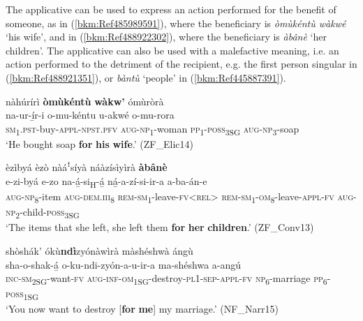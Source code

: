 The applicative can be used to express an action performed for the benefit of someone, as in (\ref{bkm:Ref485989591}), where the beneficiary is \textit{òmùkéntù wàkwé} ‘his wife’, and in (\ref{bkm:Ref488922302}), where the beneficiary is \textit{àbânè} ‘her children’. The applicative can also be used with a malefactive meaning, i.e. an action performed to the detriment of the recipient, e.g. the first person singular in (\ref{bkm:Ref488921351}), or \textit{bàntù} ‘people’ in (\ref{bkm:Ref445887391}).

\ea
\label{bkm:Ref485989591}
nàhúrírì \textbf{òmùkéntù} \textbf{wàkw’} ómùròrà\\
\gll na-ur-í̲r-i        o-mu-kéntu    u-akwé o-mu-rora\\
\textsc{sm}\textsubscript{1}.\textsc{pst}-buy-\textsc{appl}-\textsc{npst}.\textsc{pfv}  \textsc{aug}-\textsc{np}\textsubscript{1}-woman  \textsc{pp}\textsubscript{1}-\textsc{poss}\textsubscript{3SG}
\textsc{aug}-\textsc{np}\textsubscript{3}-soap\\
\glt ‘He bought soap \textbf{for} \textbf{his} \textbf{wife}.’ (ZF\_Elic14)
\z

\ea
\label{bkm:Ref488922302}
èzìbyá èzò nàáꜝsíyà náàzísìyìrà \textbf{àbânè}\\
\gll e-zi-byá    e-zo    na-á̲-si\textsubscript{H}-á̲
ná̲-a-zí-si-ir-a       a-ba-án-e\\
\textsc{aug}-\textsc{np}\textsubscript{8}-item  \textsc{aug}-\textsc{dem}.\textsc{iii}\textsubscript{8}  \textsc{rem}-\textsc{sm}\textsubscript{1}-leave-\textsc{fv}<\textsc{rel}>
\textsc{rem}-\textsc{sm}\textsubscript{1}-\textsc{om}\textsubscript{8}-leave-\textsc{appl}-\textsc{fv}  \textsc{aug}-\textsc{np}\textsubscript{2}-child-\textsc{poss}\textsubscript{3SG}\\
\glt ‘The items that she left, she left them \textbf{for} \textbf{her} \textbf{children}.’ (ZF\_Conv13)
\z

\ea
\label{bkm:Ref488921351}
shòshák’ ókù\textbf{ndì}zyónàwìrà màshéshwà ángù\\
\gll sha-o-shak-á̲    o-ku-ndi-zyón-a-u-ir-a ma-shéshwa    a-angú\\
\textsc{inc}-\textsc{sm}\textsubscript{2SG}-want-\textsc{fv}  \textsc{aug}-\textsc{inf}-\textsc{om}\textsubscript{1SG}-destroy-\textsc{pl}1-\textsc{sep}-\textsc{appl}-\textsc{fv}
\textsc{np}\textsubscript{6}-marriage    \textsc{pp}\textsubscript{6}-\textsc{poss}\textsubscript{1SG}\\
\glt ‘You now want to destroy [\textbf{for} \textbf{me}] my marriage.’ (NF\_Narr15)
\z

